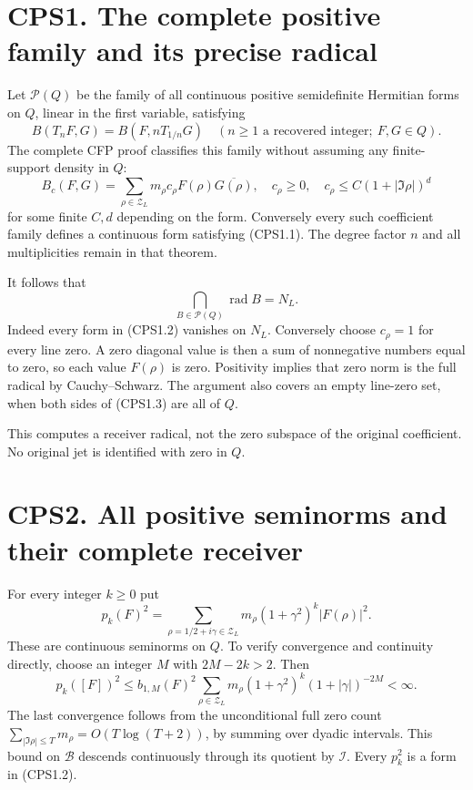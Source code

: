 \section{CPS1. The complete positive family and its precise
radical}\label{cps1.-the-complete-positive-family-and-its-precise-radical}

Let \(\mathscr P(Q)\) be the family of all continuous positive
semidefinite Hermitian forms on \(Q\), linear in the first variable,
satisfying \[
B(T_nF,G)=B(F,nT_{1/n}G)
\quad(n\ge1\text{ a recovered integer};\ F,G\in Q).
\tag{CPS1.1}
\] The complete CFP proof classifies this family without assuming any
finite-support density in \(Q\): \[
B_c(F,G)=\sum_{\rho\in\mathscr Z_L}
m_\rho c_\rho F(\rho)\overline{G(\rho)},
\quad c_\rho\ge0,\quad
c_\rho\le C(1+|\Im\rho|)^d
\tag{CPS1.2}
\] for some finite \(C,d\) depending on the form. Conversely every such
coefficient family defines a continuous form satisfying (CPS1.1). The
degree factor \(n\) and all multiplicities remain in that theorem.

It follows that \[
\bigcap_{B\in\mathscr P(Q)}\operatorname{rad}B=N_L.
\tag{CPS1.3}
\] Indeed every form in (CPS1.2) vanishes on \(N_L\). Conversely choose
\(c_\rho=1\) for every line zero. A zero diagonal value is then a sum of
nonnegative numbers equal to zero, so each value \(F(\rho)\) is zero.
Positivity implies that zero norm is the full radical by
Cauchy--Schwarz. The argument also covers an empty line-zero set, when
both sides of (CPS1.3) are all of \(Q\).

This computes a receiver radical, not the zero subspace of the original
coefficient. No original jet is identified with zero in \(Q\).

\section{CPS2. All positive seminorms and their complete
receiver}\label{cps2.-all-positive-seminorms-and-their-complete-receiver}

For every integer \(k\ge0\) put \[
p_k(F)^2=\sum_{\rho=1/2+i\gamma\in\mathscr Z_L}
m_\rho(1+\gamma^2)^k|F(\rho)|^2.
\tag{CPS2.1}
\] These are continuous seminorms on \(Q\). To verify convergence and
continuity directly, choose an integer \(M\) with \(2M-2k>2\). Then \[
p_k([F])^2\le b_{1,M}(F)^2
\sum_{\rho\in\mathscr Z_L}m_\rho(1+\gamma^2)^k
(1+|\gamma|)^{-2M}<\infty.
\tag{CPS2.2}
\] The last convergence follows from the unconditional full zero count
\(\sum_{|\Im\rho|\le T}m_\rho=O(T\log(T+2))\), by summing over dyadic
intervals. This bound on \(\mathcal B\) descends continuously through
its quotient by \(\mathcal I\). Every \(p_k^2\) is a form in (CPS1.2).

